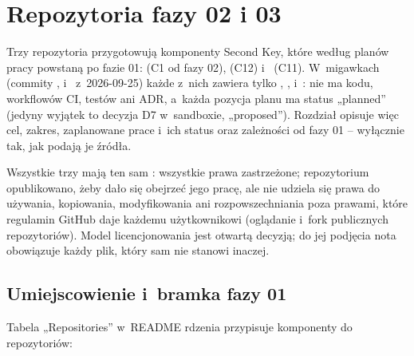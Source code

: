 \section{Repozytoria fazy 02 i 03}\label{sec:faza02}

Trzy repozytoria przygotowują komponenty Second Key, które według planów pracy powstaną po
fazie 01:  (C1 od fazy 02),
 (C12) i~ (C11).
W~migawkach (commity ,  i~
z~2026-09-25) każde z~nich zawiera tylko , ,
 i~: nie ma kodu, workflowów CI, testów ani ADR, a~każda
pozycja planu ma status „planned” (jedyny wyjątek to decyzja D7 w~sandboxie, „proposed”).
Rozdział opisuje więc cel, zakres, zaplanowane prace i~ich status oraz zależności od fazy 01
-- wyłącznie tak, jak podają je źródła.

Wszystkie trzy mają ten sam : wszystkie prawa zastrzeżone; repozytorium
opublikowano, żeby dało się obejrzeć jego pracę, ale nie udziela się prawa do używania,
kopiowania, modyfikowania ani rozpowszechniania poza prawami, które regulamin GitHub daje
każdemu użytkownikowi (oglądanie i~fork publicznych repozytoriów). Model licencjonowania
jest otwartą decyzją; do jej podjęcia nota obowiązuje każdy plik, który sam nie stanowi
inaczej.



\subsection{Umiejscowienie i~bramka fazy 01}\label{sec:faza02-bramka}

Tabela „Repositories” w~README rdzenia przypisuje komponenty do repozytoriów:

